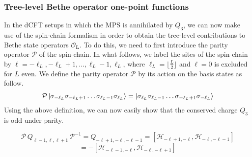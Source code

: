 \subsubsection{Tree-level Bethe operator one-point functions}
In the dCFT setups in which the MPS is annihilated by $Q_3$, we can now make use of the spin-chain formalism in order to obtain the tree-level contributions to Bethe state operators $\mathcal{O}_{\boldsymbol{L}}$. To do this, we need to first introduce the parity operator $\mathcal{P}$ of the spin-chain. In what follows, we label the sites of the spin-chain by $\ell = -\ell_L, -\ell_L + 1, \ldots , \ell_L - 1, \ell_L$, where $\ell_L = \lfloor \frac{L}{2} \rfloor$ and $\ell = 0$ is excluded for $L$ even. We define the parity operator $\mathcal{P}$ by its action on the basis states as follow.
%
%
\begin{equation}
\mathcal{P} \ket{\sigma_{-\ell_L} \sigma_{-\ell_L+1} \ldots \sigma_{\ell_L - 1} \sigma_{\ell_L}}
=
\ket{\sigma_{\ell_L} \sigma_{\ell_L-1} \ldots \sigma_{-\ell_L + 1} \sigma_{-\ell_L}}
\end{equation}
%
%
Using the above definition, we can now easily show that the conserved charge $Q_3$ is odd under parity.

\newpage
%
%
\begin{equation*}
\mathcal{P} \, Q_{\ell-1,\ell,\ell+1} \, \mathcal{P}^{-1}
=
Q_{-\ell+1, -\ell, -\ell-1}
=
[\mathcal{H}_{-\ell+1, -\ell}, \mathcal{H}_{-\ell, -\ell-1}]
\end{equation*}
%
%
\begin{equation}
=
-[\mathcal{H}_{-\ell-1, -\ell}, \mathcal{H}_{-\ell, -\ell+1}]
\end{equation}
%
%


